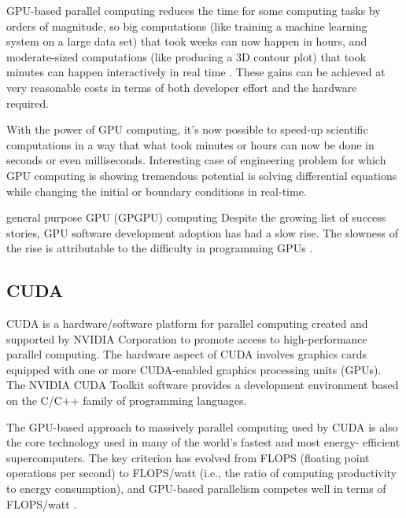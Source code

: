 GPU-based parallel computing reduces the time for some computing tasks by orders of magnitude, so big computations (like training a machine learning system on a large data set) that took weeks can now happen in hours, and moderate-sized computations (like producing a 3D contour plot) that took minutes can happen interactively in real time \cite{stortiCudaForEngineers2015}. These gains can be achieved at very reasonable costs in terms of both developer effort and the hardware required.

With the power of GPU computing, it's now possible to speed-up scientific computations in a way that what took minutes or hours can now be done in seconds or even milliseconds. Interesting case of engineering problem for which GPU computing is showing tremendous potential is solving differential equations while changing the initial or boundary conditions in real-time.

general purpose GPU (GPGPU) computing
Despite the growing list of success stories, GPU software development adoption has had a slow rise. The slowness of the rise is attributable to the difficulty in programming GPUs \citep{malcolmArrayFireGPUAcceleration2012}.

\subsection{CUDA}

CUDA is a hardware/software platform for parallel computing created and supported by NVIDIA Corporation to promote access to high-performance parallel computing. The hardware aspect of CUDA involves graphics cards equipped with one or more CUDA-enabled graphics processing units (GPUs). The NVIDIA CUDA Toolkit software provides a development environment based on the C/C++ family of programming languages.

\cite{stortiCudaForEngineers2015}

The GPU-based approach to massively parallel computing used by CUDA is also the core technology used in many of the world’s fastest and most energy- efficient supercomputers. The key criterion has evolved from FLOPS (floating point operations per second) to FLOPS/watt (i.e., the ratio of computing productivity to energy consumption), and GPU-based parallelism competes well in terms of FLOPS/watt \citep{stortiCudaForEngineers2015}.


\citep{karimiPerformanceComparisonCUDA}

